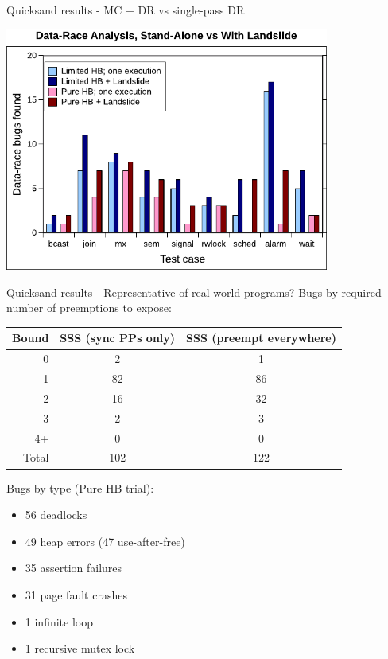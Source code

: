 \documentclass[xcolor=dvipsnames]{beamer}
\begin{document}
\begin{frame}{Quicksand results - MC + DR vs single-pass DR}
	\begin{center}
		\includegraphics[width=0.8\textwidth]{../../oopsla/dr-false-negatives-poster.pdf}
	\end{center}
\end{frame}
\begin{frame}{Quicksand results - Representative of real-world programs?}
	Bugs by required number of preemptions to expose:
	\begin{center}
		\footnotesize
	\begin{tabular}{r|c|c}
		{\bf Bound} & {\bf SSS (sync PPs only)} & {\bf SSS (preempt everywhere)} \\
		\hline
		0       & 2     & 1     \\
		1       & 82    & 86    \\
		2       & 16    & 32    \\
		3       & 2     & 3     \\
		4+      & 0     & 0     \\
		\hline
		Total   & 102   & 122   \\
	\end{tabular}
	\end{center}
	\linegap

	Bugs by type (Pure HB trial):
	\begin{itemize}
		\item 56 deadlocks
		\item 49 heap errors (47 use-after-free)
		\item 35 assertion failures
		\item 31 page fault crashes
		\item 1 infinite loop
		\item 1 recursive mutex lock
	\end{itemize}
\end{frame}
\end{document}
